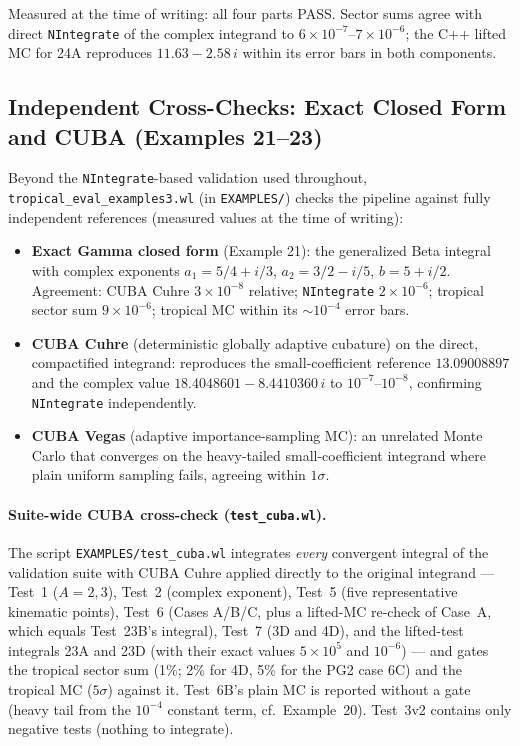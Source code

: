 \documentclass[11pt,a4paper]{article}
\begin{document}
Measured at the time of writing: all four parts PASS. Sector sums agree with direct \texttt{NIntegrate} of the complex integrand to $6\times10^{-7}$--$7\times10^{-6}$; the C++ lifted MC for 24A reproduces $11.63 - 2.58\,i$ within its error bars in both components.

\subsection{Independent Cross-Checks: Exact Closed Form and CUBA (Examples 21--23)}\label{sec:cubacheck}

Beyond the \texttt{NIntegrate}-based validation used throughout, \texttt{tropical\_eval\_examples3.wl} (in \texttt{EXAMPLES/}) checks the pipeline against fully independent references (measured values at the time of writing):

\begin{itemize}
  \item \textbf{Exact Gamma closed form} (Example 21): the generalized Beta integral with complex exponents $a_1 = 5/4 + i/3$, $a_2 = 3/2 - i/5$, $b = 5 + i/2$. Agreement: CUBA Cuhre $3{\times}10^{-8}$ relative; \texttt{NIntegrate} $2{\times}10^{-6}$; tropical sector sum $9{\times}10^{-6}$; tropical MC within its $\sim 10^{-4}$ error bars.
  \item \textbf{CUBA Cuhre} (deterministic globally adaptive cubature) on the direct, compactified integrand: reproduces the small-coefficient reference $13.09008897$ and the complex value $18.4048601 - 8.4410360\,i$ to $10^{-7}$--$10^{-8}$, confirming \texttt{NIntegrate} independently.
  \item \textbf{CUBA Vegas} (adaptive importance-sampling MC): an unrelated Monte Carlo that converges on the heavy-tailed small-coefficient integrand where plain uniform sampling fails, agreeing within $1\sigma$.
\end{itemize}

\paragraph{Suite-wide CUBA cross-check (\texttt{test\_cuba.wl}).} The script \texttt{EXAMPLES/test\_cuba.wl} integrates \emph{every} convergent integral of the validation suite with CUBA Cuhre applied directly to the original integrand --- Test~1 ($A = 2, 3$), Test~2 (complex exponent), Test~5 (five representative kinematic points), Test~6 (Cases A/B/C, plus a lifted-MC re-check of Case~A, which equals Test~23B's integral), Test~7 (3D and 4D), and the lifted-test integrals 23A and 23D (with their exact values $5{\times}10^5$ and $10^{-6}$) --- and gates the tropical sector sum (1\%; 2\% for 4D, 5\% for the PG2 case 6C) and the tropical MC ($5\sigma$) against it. Test~6B's plain MC is reported without a gate (heavy tail from the $10^{-4}$ constant term, cf.\ Example~20). Test~3v2 contains only negative tests (nothing to integrate).
\end{document}
